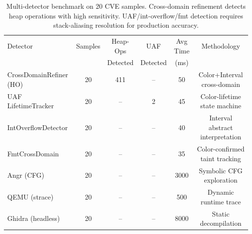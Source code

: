 \begin{table}[htbp]
\centering
\caption{Multi-detector benchmark on 20 CVE samples. Cross-domain refinement detects heap operations with high sensitivity. UAF/int-overflow/fmt detection requires stack-aliasing resolution for production accuracy.}
\label{tab:benchmark}
\begin{tabular}{lccccc}
\toprule
Detector & Samples & Heap-Ops & UAF & Avg Time & Methodology \\
 &  & Detected & Detected & (ms) & \\
\midrule
CrossDomainRefiner (HO) & 20 & 411 & -- & 50 & Color+Interval cross-domain \\
UAF LifetimeTracker & 20 & -- & 2 & 45 & Color-lifetime state machine \\
IntOverflowDetector & 20 & -- & -- & 40 & Interval abstract interpretation \\
FmtCrossDomain & 20 & -- & -- & 35 & Color-confirmed taint tracking \\
\midrule
Angr (CFG) & 20 & -- & -- & 3000 & Symbolic CFG exploration \\
QEMU (strace) & 20 & -- & -- & 500 & Dynamic runtime trace \\
Ghidra (headless) & 20 & -- & -- & 8000 & Static decompilation \\
\bottomrule
\end{tabular}
\end{table}
